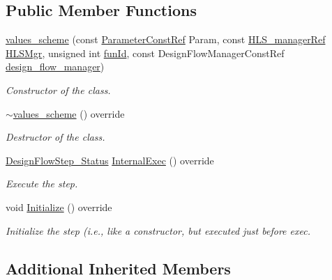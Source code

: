 \subsection*{Public Member Functions}
\begin{DoxyCompactItemize}
\item 
\hyperlink{classvalues__scheme_a056d10ea16901129e0a1a722b462b578}{values\+\_\+scheme} (const \hyperlink{Parameter_8hpp_a37841774a6fcb479b597fdf8955eb4ea}{Parameter\+Const\+Ref} Param, const \hyperlink{hls__manager_8hpp_acd3842b8589fe52c08fc0b2fcc813bfe}{H\+L\+S\+\_\+manager\+Ref} \hyperlink{classHLS__step_ade85003a99d34134418451ddc46a18e9}{H\+L\+S\+Mgr}, unsigned int \hyperlink{classHLSFunctionStep_a3e6434fd86c698b0c70520b859bff5b0}{fun\+Id}, const Design\+Flow\+Manager\+Const\+Ref \hyperlink{classDesignFlowStep_ab770677ddf087613add30024e16a5554}{design\+\_\+flow\+\_\+manager})
\begin{DoxyCompactList}\small\item\em Constructor of the class. \end{DoxyCompactList}\item 
\hyperlink{classvalues__scheme_a8826089f5df9283b5c9a5c058c1e7893}{$\sim$values\+\_\+scheme} () override
\begin{DoxyCompactList}\small\item\em Destructor of the class. \end{DoxyCompactList}\item 
\hyperlink{design__flow__step_8hpp_afb1f0d73069c26076b8d31dbc8ebecdf}{Design\+Flow\+Step\+\_\+\+Status} \hyperlink{classvalues__scheme_a50f8ae25513ed41d826c56758af143c3}{Internal\+Exec} () override
\begin{DoxyCompactList}\small\item\em Execute the step. \end{DoxyCompactList}\item 
void \hyperlink{classvalues__scheme_aa31c876e845bc7ea78495e0b789cc51f}{Initialize} () override
\begin{DoxyCompactList}\small\item\em Initialize the step (i.\+e., like a constructor, but executed just before exec. \end{DoxyCompactList}\end{DoxyCompactItemize}
\subsection*{Additional Inherited Members}


